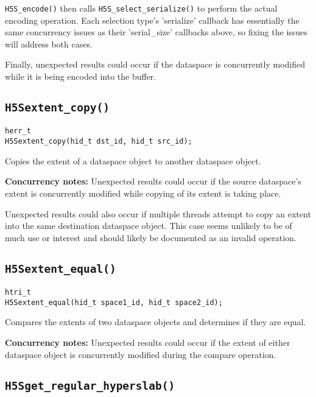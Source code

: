 \documentclass[../HDF5_RFC.tex]{subfiles}
\begin{document}
\texttt{H5S\_encode()} then calls \texttt{H5S\_select\_serialize()} to perform the actual
encoding operation. Each selection type's 'serialize' callback has essentially the same concurrency
issues as their 'serial\_size' callbacks above, so fixing the issues will address both cases.

Finally, unexpected results could occur if the dataspace is concurrently modified while it is being
encoded into the buffer.

\subsection{\texttt{H5Sextent\_copy()}}
\label{apdx:h5s_func_h5sextent_copy}

\begin{verbatim}
herr_t
H5Sextent_copy(hid_t dst_id, hid_t src_id);
\end{verbatim}

Copies the extent of a dataspace object to another dataspace object.

\textbf{Concurrency notes:} Unexpected results could occur if the source dataspace's extent is
concurrently modified while copying of its extent is taking place.

Unexpected results could also occur if multiple threads attempt to copy an extent into the
same destination dataspace object. This case seems unlikely to be of much use or interest
and should likely be documented as an invalid operation.

\subsection{\texttt{H5Sextent\_equal()}}
\label{apdx:h5s_func_h5sextent_equal}

\begin{verbatim}
htri_t
H5Sextent_equal(hid_t space1_id, hid_t space2_id);
\end{verbatim}

Compares the extents of two dataspace objects and determines if they are equal.

\textbf{Concurrency notes:} Unexpected results could occur if the extent of either dataspace
object is concurrently modified during the compare operation.

\subsection{\texttt{H5Sget\_regular\_hyperslab()}}
\label{apdx:h5s_func_h5sget_regular_hyperslab}
\end{document}
